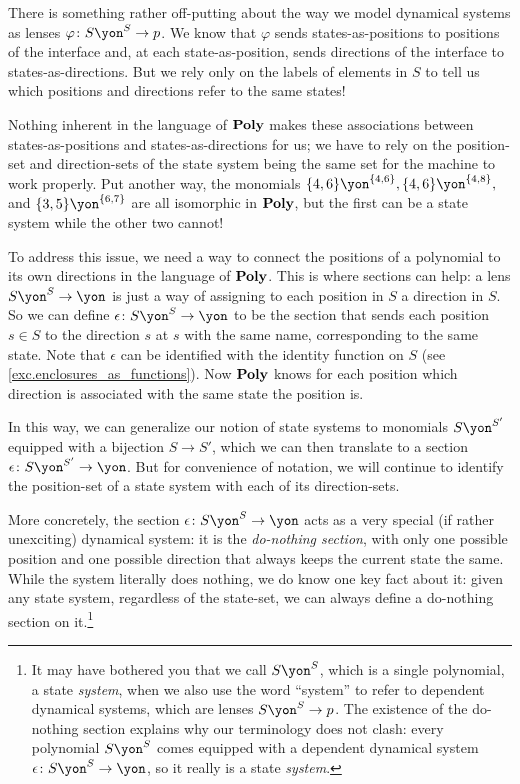 \documentclass[Book-Poly]{subfiles}
\begin{document}
\begin{example} \label{ex.do_nothing}
There is something rather off-putting about the way we model dynamical systems as lenses $\varphi\colon S\yon^S\to p$.
We know that $\varphi$ sends states-as-positions to positions of the interface and, at each state-as-position, sends directions of the interface to states-as-directions.
But we rely only on the labels of elements in $S$ to tell us which positions and directions refer to the same states!

Nothing inherent in the language of $\mathbf{Poly}$ makes these associations between states-as-positions and states-as-directions for us; we have to rely on the position-set and direction-sets of the state system being the same set for the machine to work properly.
Put another way, the monomials $\{4,6\}\yon^{\{4,6\}},\{4,6\}\yon^{\{4,8\}},$ and $\{3,5\}\yon^{\{6,7\}}$ are all isomorphic in $\mathbf{Poly}$, but the first can be a state system while the other two cannot!

To address this issue, we need a way to connect the positions of a polynomial to its own directions in the language of $\mathbf{Poly}$.
This is where sections can help: a lens $S\yon^S\to\yon$ is just a way of assigning to each position in $S$ a direction in $S$.
So we can define $\epsilon\colon S\yon^S\to\yon$ to be the section that sends each position $s\in S$ to the direction $s$ at $s$ with the same name, corresponding to the same state.
Note that $\epsilon$ can be identified with the identity function on $S$ (see \cref{exc.enclosures_as_functions}).
Now $\mathbf{Poly}$ knows for each position which direction is associated with the same state the position is.

In this way, we can generalize our notion of state systems to monomials $S\yon^{S'}$ equipped with a bijection $S\to S'$, which we can then translate to a section $\epsilon\colon S\yon^{S'}\to\yon$.
But for convenience of notation, we will continue to identify the position-set of a state system with each of its direction-sets.

More concretely, the section $\epsilon\colon S\yon^S\to\yon$ acts as a very special (if rather unexciting) dynamical system: it is the \emph{do-nothing section}, with only one possible position and one possible direction that always keeps the current state the same.
While the system literally does nothing, we do know one key fact about it: given any state system, regardless of the state-set, we can always define a do-nothing section on it.\footnote{It may have bothered you that we call $S\yon^S$, which is a single polynomial, a state \emph{system}, when we also use the word ``system'' to refer to dependent dynamical systems, which are lenses $S\yon^S\to p$.
The existence of the do-nothing section explains why our terminology does not clash: every polynomial $S\yon^S$ comes equipped with a dependent dynamical system $\epsilon\colon S\yon^S\to\yon$, so it really is a state \emph{system}.
}


\end{example}
\end{document}
